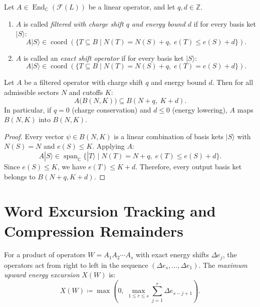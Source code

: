 \begin{definition}
Let $A \in \operatorname{End}_{\mathbb{C}}(\mathcal{F}(L))$ be a linear operator, and let $q, d \in \mathbb{Z}$.
\begin{enumerate}
    \item $A$ is called \emph{filtered with charge shift $q$ and energy bound $d$} if for every basis ket $|S\rangle$:
    \begin{equation}
    A |S\rangle \in \operatorname{coord}\left( \{T \subseteq B \mid N(T) = N(S) + q,\; e(T) \le e(S) + d\} \right).
    \end{equation}
    \item $A$ is called an \emph{exact shift operator} if for every basis ket $|S\rangle$:
    \begin{equation}
    A |S\rangle \in \operatorname{coord}\left( \{T \subseteq B \mid N(T) = N(S) + q,\; e(T) = e(S) + d\} \right).
    \end{equation}
\end{enumerate}
\end{definition}

\begin{theorem}
\label{thm:app_filtration_preservation}
Let $A$ be a filtered operator with charge shift $q$ and energy bound $d$. Then for all admissible sectors $N$ and cutoffs $K$:
\begin{equation}
A\big( B(N, K) \big) \subseteq B(N + q, \; K + d).
\end{equation}
In particular, if $q = 0$ (charge conservation) and $d \le 0$ (energy lowering), $A$ maps $B(N, K)$ into $B(N, K)$.
\end{theorem}

\begin{proof}
Every vector $\psi \in B(N, K)$ is a linear combination of basis kets $|S\rangle$ with $N(S) = N$ and $e(S) \le K$.
Applying $A$:
\[
A |S\rangle \in \operatorname{span}_{\mathbb{C}} \{ |T\rangle \mid N(T) = N + q,\; e(T) \le e(S) + d \}.
\]
Since $e(S) \le K$, we have $e(T) \le K + d$.
Therefore, every output basis ket belongs to $B(N + q, K + d)$.
\end{proof}

\section{Word Excursion Tracking and Compression Remainders}

\begin{definition}
For a product of operators $W = A_1 A_2 \cdots A_s$ with exact energy shifts $\Delta e_j$, the operators act from right to left in the sequence $(\Delta e_s, \dots, \Delta e_1)$.
The \emph{maximum upward energy excursion} $X(W)$ is:
\begin{equation}
X(W) \coloneqq \max\left( 0, \; \max_{1 \le r \le s} \sum_{j=1}^r \Delta e_{s - j + 1} \right).
\end{equation}
\end{definition}

